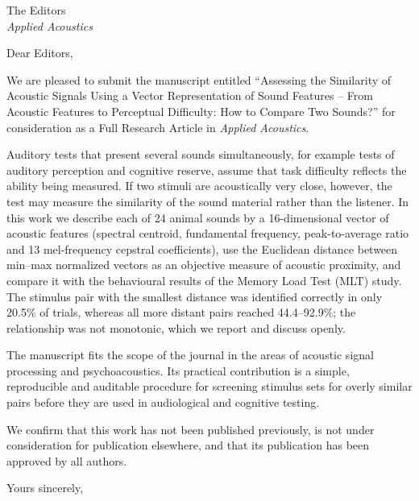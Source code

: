 \documentclass[11pt]{letter}
\begin{document}
\begin{letter}{The Editors\\ \textit{Applied Acoustics}}

\opening{Dear Editors,}

We are pleased to submit the manuscript entitled ``Assessing the Similarity of Acoustic Signals Using a Vector Representation of Sound Features -- From Acoustic Features to Perceptual Difficulty: How to Compare Two Sounds?'' for consideration as a Full Research Article in \textit{Applied Acoustics}.

Auditory tests that present several sounds simultaneously, for example tests of auditory perception and cognitive reserve, assume that task difficulty reflects the ability being measured. If two stimuli are acoustically very close, however, the test may measure the similarity of the sound material rather than the listener. In this work we describe each of 24 animal sounds by a 16-dimensional vector of acoustic features (spectral centroid, fundamental frequency, peak-to-average ratio and 13 mel-frequency cepstral coefficients), use the Euclidean distance between min--max normalized vectors as an objective measure of acoustic proximity, and compare it with the behavioural results of the Memory Load Test (MLT) study. The stimulus pair with the smallest distance was identified correctly in only 20.5\% of trials, whereas all more distant pairs reached 44.4--92.9\%; the relationship was not monotonic, which we report and discuss openly.

The manuscript fits the scope of the journal in the areas of acoustic signal processing and psychoacoustics. Its practical contribution is a simple, reproducible and auditable procedure for screening stimulus sets for overly similar pairs before they are used in audiological and cognitive testing.

We confirm that this work has not been published previously, is not under consideration for publication elsewhere, and that its publication has been approved by all authors.

\closing{Yours sincerely,}

\end{letter}
\end{document}
